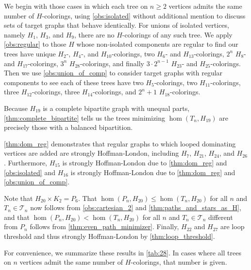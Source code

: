 \documentclass[11pt]{article}
\theoremstyle{definition}
\begin{document}
We begin with those cases in which each tree on $n \ge 2$ vertices admits the same number of $H$-colorings, using \cref{obs:isolated} without additional mention to discuss sets of target graphs that behave identically. For unions of isolated vertices, namely $H_1$, $H_3$, and $H_9$, there are no $H$-colorings of any such tree. We apply \cref{obs:regular} to those $H$ whose non-isolated components are regular to find our trees have unique $H_2$-, $H_4$-, and $H_{10}$-colorings, two $H_6$- and $H_{13}$-colorings, $2^n$ $H_8$- and $H_{17}$-colorings, $3^n$ $H_{28}$-colorings, and finally $3\cdot2^{n-1}$ $H_{23}$- and $H_{25}$-colorings. Then we use \cref{obs:union_of_comp} to consider target graphs with regular components to see each of these trees have two $H_5$-colorings, two $H_{11}$-colorings, three $H_{12}$-colorings, three $H_{14}$-colorings, and $2^n+1$ $H_{18}$-colorings.

Because $H_{19}$ is a complete bipartite graph with unequal parts, \cref{thm:complete_bipartite} tells us the trees minimizing $\hom(T_n,H_{19})$ are precisely those with a balanced bipartition.

\cref{thm:dom_reg} demonstrates that regular graphs to which looped dominating vertices are added are strongly Hoffman-London, including $H_7$, $H_{21}$, $H_{24}$, and $H_{26}$. Furthermore, $H_{15}$ is strongly Hoffman-London due to \cref{thm:dom_reg} and \cref{obs:isolated} and $H_{16}$ is strongly Hoffman-London due to \cref{thm:dom_reg} and \cref{obs:union_of_comp}. 

Note that $H_{20} \times K_2 = P_6$. That $\hom(P_n,H_{20}) \le \hom(T_n,H_{20})$ for all $n$ and $T_n \in {\mathcal T_n}$ now follows from \cref{obs:cartesian_2} and \cref{thm:paths_and_stars_as_H}, and that $\hom(P_n,H_{20}) < \hom(T_n,H_{20})$ for all $n$ and $T_n \in {\mathcal T_n}$ different from $P_n$ follows from \cref{thm:even_path_minimizer}. Finally, $H_{22}$ and $H_{27}$ are loop threshold and thus strongly Hoffman-London by \cref{thm:loop_threshold}.

For convenience, we summarize these results in \cref{tab:28}. In cases where all trees on $n$ vertices admit the same number of $H$-colorings, that number is given.
\end{document}
